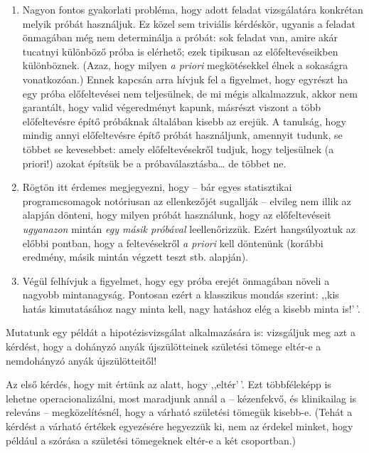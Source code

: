 \documentclass[
]{book}
\providecommand{\tightlist}{%
  \setlength{\itemsep}{0pt}\setlength{\parskip}{0pt}}
\begin{document}
\begin{enumerate}
\def\labelenumi{\arabic{enumi}.}
\tightlist
\item
  Nagyon fontos gyakorlati probléma, hogy adott feladat vizsgálatára konkrétan melyik próbát használjuk. Ez közel sem triviális kérdéskör, ugyanis a feladat önmagában még nem determinálja a próbát: sok feladat van, amire akár tucatnyi különböző próba is elérhető; ezek tipikusan az előfeltevéseikben különböznek. (Azaz, hogy milyen \emph{a priori} megkötésekkel élnek a sokaságra vonatkozóan.) Ennek kapcsán arra hívjuk fel a figyelmet, hogy egyrészt ha egy próba előfeltevései nem teljesülnek, de mi mégis alkalmazzuk, akkor nem garantált, hogy valid végeredményt kapunk, másrészt viszont a több előfeltevésre építő próbáknak általában kisebb az erejük. A tanulság, hogy mindig annyi előfeltevésre építő próbát használjunk, amennyit tudunk, se többet se kevesebbet: amely előfeltevésekről tudjuk, hogy teljesülnek (a priori!) azokat építsük be a próbaválasztásba\dots{} de többet ne.
\item
  Rögtön itt érdemes megjegyezni, hogy -- bár egyes statisztikai programcsomagok notóriusan az ellenkezőjét sugallják -- elvileg nem illik az alapján dönteni, hogy milyen próbát használunk, hogy az előfeltevéseit \emph{ugyanazon} mintán \emph{egy másik próbával} leellenőrizzük. Ezért hangsúlyoztuk az előbbi pontban, hogy a feltevésekről \emph{a priori} kell döntenünk (korábbi eredmény, másik mintán végzett teszt stb. alapján).
\item
  Végül felhívjuk a figyelmet, hogy egy próba erejét önmagában növeli a nagyobb mintanagyság. Pontosan ezért a klasszikus mondás szerint: ,,kis hatás kimutatásához nagy minta kell, nagy hatáshoz elég a kisebb minta is!'\,'.
\end{enumerate}

Mutatunk egy példát a hipotézisvizsgálat alkalmazására is: vizsgáljuk meg azt a kérdést, hogy a dohányzó anyák újszülötteinek születési tömege eltér-e a nemdohányzó anyák újszülötteitől!

Az első kérdés, hogy mit értünk az alatt, hogy ,,eltér'\,'. Ezt többféleképp is lehetne operacionalizálni, most maradjunk annál a -- kézenfekvő, és klinikailag is releváns -- megközelítésnél, hogy a várható születési tömegük kisebb-e. (Tehát a kérdést a várható értékek egyezésére hegyezzük ki, nem az érdekel minket, hogy például a szórása a születési tömegeknek eltér-e a két csoportban.)
\end{document}
